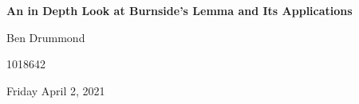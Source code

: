 \documentclass[../main.tex]{subfiles}
\begin{document}
   \begin{center}
    \vspace*{1cm}

       \textbf{An in Depth Look at Burnside's Lemma and Its Applications}
            
       \vspace{1.5cm}

       Ben Drummond
    
        1018642\\
        
       \vfill
            
       \vspace{0.8cm}
     
        Friday April 2, 2021

   \end{center}
\end{document}
